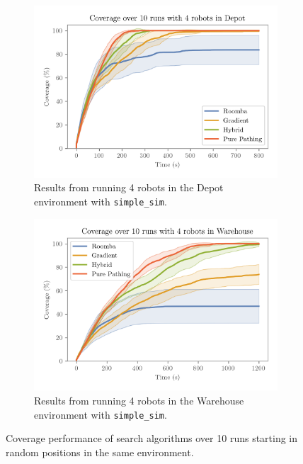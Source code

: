 \begin{figure}[H]
  \centering
  \begin{subfigure}[b]{0.49\textwidth}
    \centering
    \includegraphics[width=\textwidth]{./figures/plots/benchmarks/coverage-over-10-runs-with-4-robots-in-depot.png}
      \caption{Results from running 4 robots in the Depot environment with \texttt{simple\_sim}.}
  \end{subfigure}
  \begin{subfigure}[b]{0.49\textwidth}
    \centering
    \includegraphics[width=\textwidth]{./figures/plots/benchmarks/coverage-over-10-runs-with-4-robots-in-warehouse.png}
      \caption{Results from running 4 robots in the Warehouse environment with \texttt{simple\_sim}.}
  \end{subfigure}
    \caption{Coverage performance of search algorithms over 10 runs starting in random positions in the same environment.}
    \label{fig:coverage-benchmark}
\end{figure}

